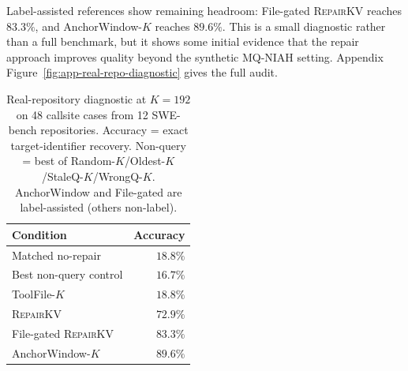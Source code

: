 \documentclass{article}
\newcommand{\repairkv}{\textsc{RepairKV}}
\begin{document}
Label-assisted references show remaining headroom: File-gated \repairkv{} reaches $83.3\%$, and AnchorWindow-$K$ reaches $89.6\%$. This is a small diagnostic rather than a full benchmark, but it shows some initial evidence that the repair approach improves quality beyond the synthetic MQ-NIAH setting. Appendix Figure~\ref{fig:app-real-repo-diagnostic} gives the full audit.
\begin{table}[!ht]
  \centering
  \setlength{\tabcolsep}{4pt}
  \renewcommand{\arraystretch}{0.95}
  \caption{{Real-repository diagnostic at $K{=}192$ on 48 callsite cases from 12 SWE-bench repositories. Accuracy = exact target-identifier recovery. Non-query = best of Random-$K$/Oldest-$K$/StaleQ-$K$/WrongQ-$K$. AnchorWindow and File-gated are label-assisted (others non-label).}}
  \label{tab:real-repo-diagnostic}
  \small
  \begin{tabular}{@{}lr@{}}
    \toprule
    Condition & Accuracy \\
    \midrule
    Matched no-repair & $18.8\%$ \\
    Best non-query control & $16.7\%$ \\
    ToolFile-$K$ & $18.8\%$ \\
    \repairkv{} & $72.9\%$ \\
    File-gated \repairkv{} & $83.3\%$ \\
    AnchorWindow-$K$ & $89.6\%$ \\
    \bottomrule
  \end{tabular}
\end{table}
\end{document}
